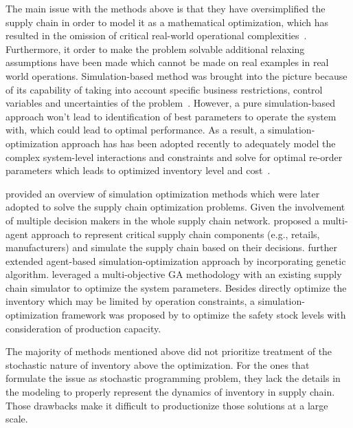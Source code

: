 The main issue with the methods above is that they have oversimplified the supply chain in order to model it as a mathematical optimization, which has resulted in the omission of critical real-world operational complexities~\citep{agarwal2019multi}. Furthermore, it order to make the problem solvable additional relaxing assumptions have been made which cannot be made on real examples in real world operations. Simulation-based method was brought into the picture because of its capability of taking into account specific business restrictions, control variables and uncertainties of the problem~\citep{KOCHEL2005505}. However, a pure simulation-based approach won't lead to identification of best parameters to operate the system with, which could lead to optimal performance. As a result, a simulation-optimization approach has has been adopted recently to adequately model the complex system-level interactions and constraints and solve for optimal re-order parameters which leads to optimized inventory level and cost~\citep{10.5555/2700739.2700741}.


\citet{1172871} provided an overview of simulation optimization methods which were later adopted to solve the supply chain optimization problems. Given the involvement of multiple decision makers in the whole supply chain network. \citet{swaminathan1998modeling} proposed a multi-agent approach to represent critical supply chain components (e.g., retails, manufacturers) and simulate the supply chain based on their decisions. \citet{mele2006simulation} further extended agent-based  simulation-optimization approach by incorporating genetic algorithm. \citet{1166395} leveraged a multi-objective GA methodology with an existing supply chain simulator to optimize the system parameters. Besides directly optimize the inventory which may be limited by operation constraints, a simulation-optimization framework was proposed by \citet{JUNG20082570} to optimize the safety stock levels with consideration of production capacity.

The majority of methods mentioned above did not prioritize treatment of the stochastic nature of inventory above the optimization. For the ones that formulate the issue as stochastic programming problem, they lack the details in the modeling to properly represent the dynamics of inventory in supply chain. Those drawbacks make it difficult to productionize those solutions at a large scale.